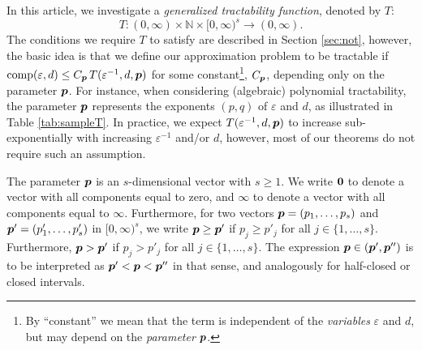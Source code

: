 \documentclass[sort&compress]{elsarticle}
\newcommand{\vinfty}{\boldsymbol{\infty}}
\begin{document}
In this article, we investigate a \emph{generalized tractability function}, denoted by $T$:
\begin{equation} \label{eq:Tspec}
    T :(0,\infty) \times \mathbb{N} \times [0,\infty)^s \rightarrow (0,\infty).
\end{equation}
The conditions we require $T$ to satisfy are described in  Section \ref{sec:not}, however, the basic idea is that we define our approximation problem to be tractable if $\operatorname{comp}(\varepsilon, d) \le  C_{\boldsymbol{p}}\, T(\varepsilon^{-1},d,\boldsymbol{p})$ for some constant\footnote{By ``constant'' we mean that the term is independent of the \emph{variables} $\varepsilon$ and $d$, but may depend on the \emph{parameter} $\boldsymbol{p}$.}, $C_{\boldsymbol{p}}$, depending only on the parameter $\boldsymbol{p}$. For instance, when considering (algebraic) polynomial tractability, the parameter $\boldsymbol{p}$ represents the exponents $(p,q)$ of $\varepsilon$ and $d$, as illustrated in Table \ref{tab:sampleT}.  In practice, we expect $T(\varepsilon^{-1},d,\boldsymbol{p})$ to increase sub-exponentially with increasing $\varepsilon^{-1}$ and/or $d$, however, most of our theorems do not require such an assumption.

The parameter $\boldsymbol{p}$ is an $s$-dimensional vector with $s \geq 1$. We write $\boldsymbol{0}$ to denote a vector with all components equal to zero, and $\vinfty$ to denote a vector with all components equal to $\infty$.
Furthermore, for two vectors $\boldsymbol{p}=(p_1,\ldots,p_s)$ and $ \boldsymbol{p}'=(p_1',\ldots,p_s')$ in $[0,\infty)^s$, 
we write $\boldsymbol{p}\ge \boldsymbol{p}'$ if $p_j\ge p'_j$ for all $j\in \{1,\ldots,s\}$. Furthermore, $\boldsymbol{p} > \boldsymbol{p}'$ 
if $p_j> p'_j$ for all $j\in \{1,\ldots,s\}$. The expression $\boldsymbol{p}\in (\boldsymbol{p}',\boldsymbol{p}'')$ is to be interpreted as 
$\boldsymbol{p}' < \boldsymbol{p} < \boldsymbol{p}''$ in that sense, and analogously for half-closed or closed intervals.
\end{document}
